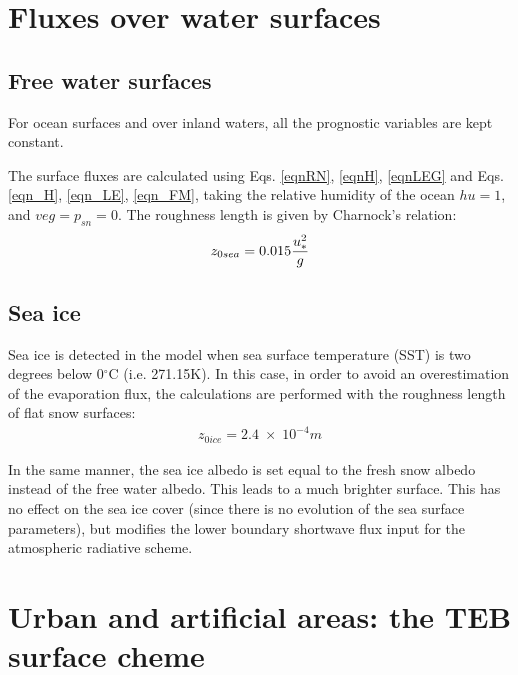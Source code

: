 \clearpage
\section{Fluxes over water surfaces}

\subsection{Free water surfaces}

For ocean surfaces and over inland waters,
all the prognostic variables are kept constant.

The surface fluxes are calculated using Eqs. \ref{eqnRN}, \ref{eqnH},
\ref{eqnLEG} and
Eqs. \ref{eqn_H}, \ref{eqn_LE}, \ref{eqn_FM},
taking the relative humidity of the ocean $hu=1$, and
$veg=p_{sn}=0$.
The roughness length is given by Charnock's relation:
\begin{eqnarray}
z_{0sea} = 0.015 {u^2_* \over g}
\end{eqnarray}

\subsection{Sea ice}

Sea ice is detected in the model when sea surface temperature (SST) is
two degrees below 0$^\circ$C (i.e. 271.15K). In this case, in order
to avoid an overestimation of the evaporation flux, the calculations
are performed with the roughness length of flat snow surfaces:
\begin{eqnarray}
z_{0ice} = 2.4 \; \times \; 10^{-4} m
\end{eqnarray}

In the same manner, the sea ice albedo is set equal to the fresh snow
albedo instead of the free water albedo. This leads to a much brighter
surface. This has no effect on the sea ice cover (since there is no evolution
of the sea surface parameters), but modifies the lower boundary shortwave flux
input for the atmospheric radiative scheme.

\clearpage
\section{Urban and artificial areas: the TEB surface cheme}

